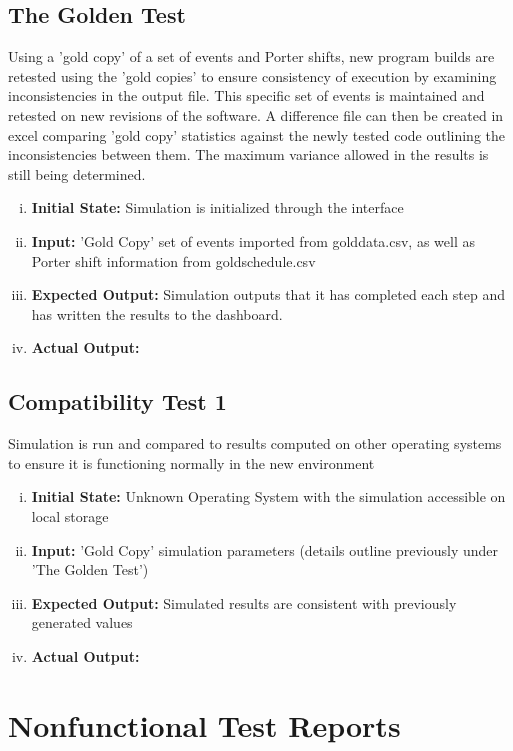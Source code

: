 \documentclass[paper=letter, fontsize=10pt]{scrartcl}
\numberwithin{equation}{section}		%
\numberwithin{figure}{section}			%
\numberwithin{table}{section}				%
\begin{document}
\subsection{The Golden Test}
Using a 'gold copy' of a set of events and Porter shifts, new program builds are retested using the 'gold copies' to ensure consistency of execution by examining inconsistencies in the output file. This specific set of events is maintained and retested on new revisions of the software. A difference file can then be created in excel comparing 'gold copy' statistics against the newly tested code outlining the inconsistencies between them. The maximum variance allowed in the results is still being determined. 
\begin{enumerate}[(i)]
	\item \textbf{Initial State:} Simulation is initialized through the interface
	\item \textbf{Input:} 'Gold Copy' set of events imported from golddata.csv, as well as Porter shift information from goldschedule.csv 
	\item \textbf{Expected Output:} Simulation outputs that it has completed each step and has written the results to the dashboard.
	\item \textbf{Actual Output:}
\end{enumerate}
\subsection{Compatibility Test 1}
Simulation is run and compared to results computed on other operating systems to ensure it is functioning normally in the new environment
\begin{enumerate}[(i)]
	\item \textbf{Initial State:} Unknown Operating System with the simulation accessible on local storage
	\item \textbf{Input:} 'Gold Copy' simulation parameters (details outline previously under 'The Golden Test')
	\item \textbf{Expected Output:} Simulated results are consistent with previously generated values
	\item \textbf{Actual Output:}
\end{enumerate}

\section{Nonfunctional Test Reports}
\end{document}
